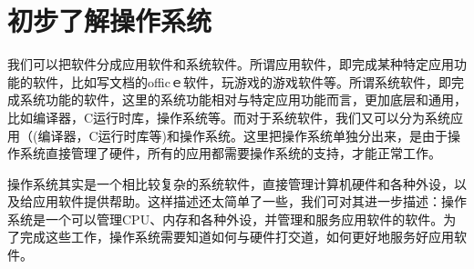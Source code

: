 \section{初步了解操作系统}

我们可以把软件分成应用软件和系统软件。所谓应用软件，即完成某种特定应用功能的软件，比如写文档的officｅ软件，玩游戏的游戏软件等。所谓系统软件，即完成系统功能的软件，这里的系统功能相对与特定应用功能而言，更加底层和通用，比如编译器，C运行时库，操作系统等。而对于系统软件，我们又可以分为系统应用（(编译器，C运行时库等)和操作系统。这里把操作系统单独分出来，是由于操作系统直接管理了硬件，所有的应用都需要操作系统的支持，才能正常工作。

操作系统其实是一个相比较复杂的系统软件，直接管理计算机硬件和各种外设，以及给应用软件提供帮助。这样描述还太简单了一些，我们可对其进一步描述：操作系统是一个可以管理CPU、内存和各种外设，并管理和服务应用软件的软件。为了完成这些工作，操作系统需要知道如何与硬件打交道，如何更好地服务好应用软件。






